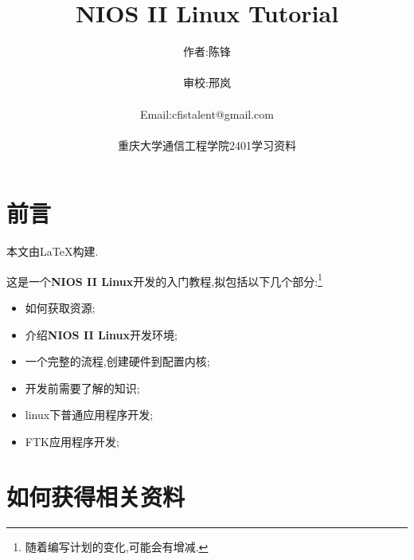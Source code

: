 \documentclass[12pt,a4paper,titlepage]{article}
\title{NIOS II Linux Tutorial}
\author{作者:陈锋\\\\审校:邢岚\\\\Email:cfistalent@gmail.com\\\\重庆大学通信工程学院2401学习资料}
\begin{document}
\thispagestyle{empty}
\maketitle{}
\section{前言}
\setcounter{footnote}{0}
本文由\LaTeX{}构建.

这是一个\textbf{NIOS II Linux}开发的入门教程,拟包括以下几个部分:\footnote{随着编写计划的变化,可能会有增减.}
\begin{itemize}
\item 如何获取资源;
\item 介绍\textbf{NIOS II Linux}开发环境;
\item 一个完整的流程,创建硬件到配置内核;
\item 开发前需要了解的知识;
\item linux下普通应用程序开发;
\item FTK应用程序开发;
\end{itemize}

\newpage{}
\section{如何获得相关资料}
\setcounter{footnote}{0}
\end{document}

